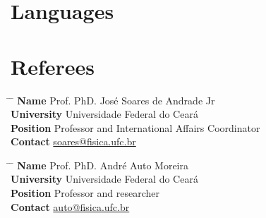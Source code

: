 \documentclass[10pt]{article} %
\begin{document}
\section{Languages}



\section{Referees}

\parbox{0.5\textwidth}{ %
\begin{tabbing}
\hspace{2.75cm} \= \hspace{4cm} \= \kill %
{\bf Name} \> Prof. PhD. José Soares de Andrade Jr \\ %
{\bf University} \> Universidade Federal do Ceará \\ %
{\bf Position} \> Professor and International Affairs Coordinator \\ %
{\bf Contact} \> \href{mailto:soares@fisica.ufc.br }{soares@fisica.ufc.br} %
\end{tabbing}}
\newline
\parbox{0.5\textwidth}{ %
\begin{tabbing}
\hspace{2.75cm} \= \hspace{4cm} \= \kill %
{\bf Name} \> Prof. PhD. André Auto Moreira\\ %
{\bf University} \> Universidade Federal do Ceará \\ %
{\bf Position} \> Professor and researcher \\ %
{\bf Contact} \> \href{mailto:auto@fisica.ufc.br}{auto@fisica.ufc.br} %
\end{tabbing}}

\end{document}
